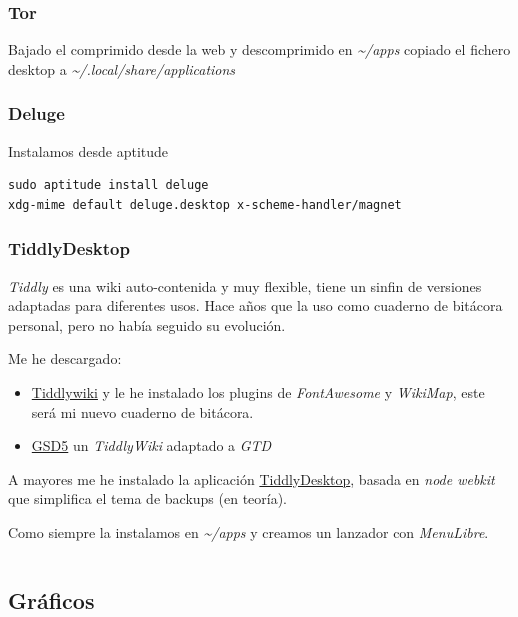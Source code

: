 \documentclass[12pt,spanish,]{article}
\providecommand{\tightlist}{%
  \setlength{\itemsep}{0pt}\setlength{\parskip}{0pt}}
\begin{document}
\subsubsection{Tor}\label{tor}

Bajado el comprimido desde la web y descomprimido en
\emph{\textasciitilde{}/apps} copiado el fichero desktop a
\emph{\textasciitilde{}/.local/share/applications}

\subsubsection{Deluge}\label{deluge}

Instalamos desde aptitude

\begin{verbatim}
sudo aptitude install deluge
xdg-mime default deluge.desktop x-scheme-handler/magnet
\end{verbatim}

\subsubsection{TiddlyDesktop}\label{tiddlydesktop}

\emph{Tiddly} es una wiki auto-contenida y muy flexible, tiene un sinfin
de versiones adaptadas para diferentes usos. Hace años que la uso como
cuaderno de bitácora personal, pero no había seguido su evolución.

Me he descargado:

\begin{itemize}
\tightlist
\item
  \href{http://tiddlywiki.com/}{Tiddlywiki} y le he instalado los
  plugins de \emph{FontAwesome} y \emph{WikiMap}, este será mi nuevo
  cuaderno de bitácora.
\item
  \href{http://gsd5.tiddlyspot.com/}{GSD5} un \emph{TiddlyWiki} adaptado
  a \emph{GTD}
\end{itemize}

A mayores me he instalado la aplicación
\href{https://github.com/Jermolene/TiddlyDesktop}{TiddlyDesktop}, basada
en \emph{node webkit} que simplifica el tema de backups (en teoría).

Como siempre la instalamos en \emph{\textasciitilde{}/apps} y creamos un
lanzador con \emph{MenuLibre}.

\begin{verbatim}
\end{verbatim}

\subsection{Gráficos}\label{gruxe1ficos}
\end{document}
